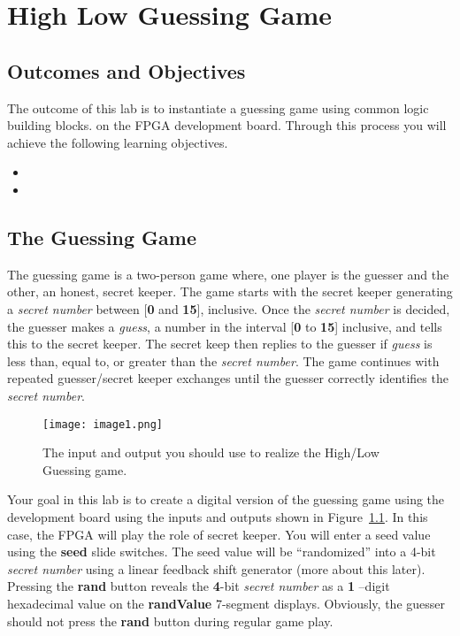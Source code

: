 \chapter{High Low Guessing Game}
\label{chapter:RPS}
\graphicspath{ {./Lab04HighLow/Fig} }

\section{Outcomes and Objectives}

The outcome of this lab is to instantiate a guessing game using 
common logic building blocks.
on the FPGA development board. 
Through this process you will achieve the following
learning objectives.
\begin{itemize}
	\item {}
	\item {}
\end{itemize}

\section{The Guessing Game}

The guessing game is a two-person game where, one player is the guesser
and the other, an honest, secret keeper. The game starts with the secret
keeper generating a \emph{secret number} between {[}\textbf{0} and
\textbf{15}{]}, inclusive. Once the \emph{secret number} is decided, the
guesser makes a \emph{guess}, a number in the interval {[}\textbf{0} to
\textbf{15}{]} inclusive, and tells this to the secret keeper. The
secret keep then replies to the guesser if \emph{guess} is less than,
equal to, or greater than the \emph{secret number}. The game continues
with repeated guesser/secret keeper exchanges until the guesser
correctly identifies the \emph{secret number}.

\begin{figure}[ht]
\texttt{[image: image1.png]}
\caption{The input and output you should use to realize the High/Low Guessing game.}
\label{fig:inputOutputDevBoard}
\end{figure}

Your goal in this lab is to create a digital version of the guessing
game using the development board using the inputs and outputs shown in
Figure~\ref{fig:inputOutputDevBoard}. In this case, the FPGA will play the role of secret keeper.
You will enter a seed value using the \textbf{seed} slide switches. The
seed value will be ``randomized'' into a 4-bit \emph{secret number}
using a linear feedback shift generator (more about this later).
Pressing the \textbf{rand} button reveals the \textbf{4}-bit
\emph{secret number} as a \textbf{1} --digit hexadecimal value on the
\textbf{randValue} 7-segment displays. Obviously, the guesser should not
press the \textbf{rand} button during regular game play.

